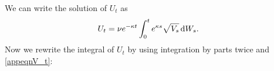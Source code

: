 \documentclass{ws-ijfe}
\begin{document}
We can write the solution of $U_t$ as
\begin{align*}
  U_t & = \nu e^{-\kappa t}\int_{0}^{t}e^{\kappa s}\sqrt{V_s}\,\mathrm{d} W_s.
\end{align*}
Now we rewrite the integral of $U_t$ by using integration by parts twice and \eqref{appeqnV_t}:
\end{document}
